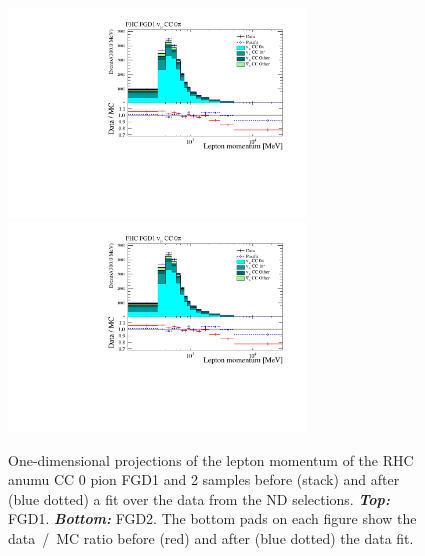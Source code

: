 \begin{figure}[ht]
  \center
  \includegraphics[keepaspectratio=true,width=0.7\textwidth,page=7]{images/BANFF/reactionCodeStacks_PrefitAndPostfit_mom.pdf}\\
  \includegraphics[keepaspectratio=true,width=0.7\textwidth,page=10]{images/BANFF/reactionCodeStacks_PrefitAndPostfit_mom.pdf}\\
  \begin{center}
    \caption[RHC $\bar{\nu}_\mu$ CC 0 pion FGD1 and 2 samples before
    and after a fit over the data from the ND280
    selections]{One-dimensional projections of the lepton momentum of
      the \Gls{RHC} \Gls{anumu} \Gls{CC} 0 pion \Gls{FGD}1 and 2
      samples before (stack) and after (blue dotted) a fit over the
      data from the \Gls{ND} selections. \textbf{\textit{Top:}}
      \Gls{FGD}1. \textbf{\textit{Bottom:}} \Gls{FGD}2. The bottom
      pads on each figure show the data~/~\Gls{MC} ratio before (red)
      and after (blue dotted) the data fit.}
    \label{fig:anumuCC0Pi}
  \end{center}
\end{figure}


